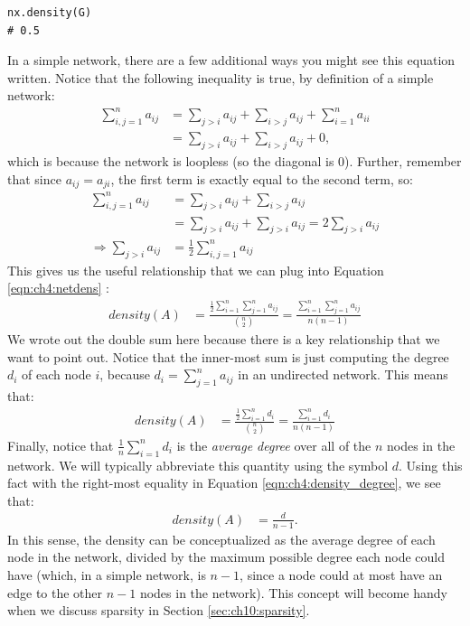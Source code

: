 \begin{lstlisting}[style=python]
nx.density(G)
# 0.5
\end{lstlisting}
In a simple network, there are a few additional ways you might see this equation written. Notice that the following inequality is true, by definition of a simple network:
\begin{align*}
    \sum_{i,j = 1}^n a_{ij} &= \sum_{j > i}a_{ij} + \sum_{i > j}a_{ij} + \sum_{i = 1}^n a_{ii} \\
    &= \sum_{j > i}a_{ij}+ \sum_{i > j}a_{ij} + 0,
\end{align*}
which is because the network is loopless (so the diagonal is $0$). Further, remember that since $a_{ij} = a_{ji}$, the first term is {exactly} equal to the second term, so:
\begin{align*}
    \sum_{i,j = 1}^n a_{ij} &= \sum_{j > i}a_{ij}+ \sum_{i > j}a_{ij} \\
    &= \sum_{j > i}a_{ij}+ \sum_{j > i}a_{ij} = 2\sum_{j > i}a_{ij} \\
    \Rightarrow \sum_{j > i}a_{ij} &= \frac{1}{2}\sum_{i,j = 1}^n a_{ij}
\end{align*}
This gives us the useful relationship that we can plug into Equation \eqref{eqn:ch4:netdens} :
\begin{align*}
    density(A) &= \frac{\frac{1}{2}\sum_{i = 1}^n \sum_{j = 1}^n a_{ij}}{\binom n 2} = \frac{\sum_{i = 1}^n \sum_{j = 1}^n a_{ij}}{n(n - 1)}
\end{align*}
We wrote out the double sum here because there is a key relationship that we want to point out. Notice that the inner-most sum is just computing the degree $d_i$ of each node $i$, because $d_i = \sum_{j = 1}^n a_{ij}$ in an undirected network. This means that:
\begin{align}
    density(A) &= \frac{\frac{1}{2}\sum_{i = 1}^n d_i}{\binom n 2} = \frac{\sum_{i = 1}^n d_i}{n(n - 1)} \label{eqn:ch4:density_degree}
\end{align}
Finally, notice that $\frac{1}{n}\sum_{i = 1}^n d_i$ is the \textit{average degree} over all of the $n$ nodes in the network. We will typically abbreviate this quantity using the symbol $d$. Using this fact with the right-most equality in Equation \eqref{eqn:ch4:density_degree}, we see that:
\begin{align*}
    density(A) &= \frac{d}{n - 1}.
\end{align*}
In this sense, the density can be conceptualized as the average degree of each node in the network, divided by the maximum possible degree each node could have (which, in a simple network, is $n-1$, since a node could at most have an edge to the other $n-1$ nodes in the network). This concept will become handy when we discuss sparsity in Section \ref{sec:ch10:sparsity}.


